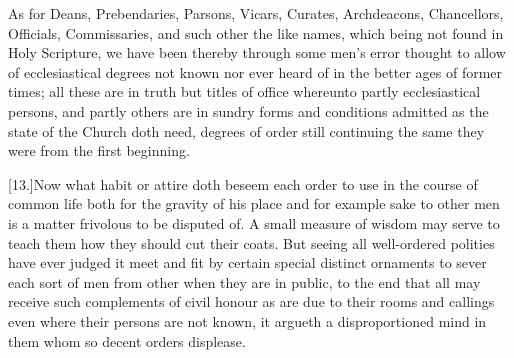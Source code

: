 As for Deans, Prebendaries, Parsons, Vicars, Curates, Archdeacons, Chancellors, Officials, Commissaries, and such other the like names, which being not found in Holy Scripture, we have been thereby through some men’s error thought to allow of ecclesiastical degrees not known nor ever heard of in the better ages of former times; all these are in truth but titles of office whereunto partly ecclesiastical persons, and partly others are in sundry forms and conditions admitted as the state of the Church doth need, degrees of order still continuing the same they were from the first beginning.

[13.]Now what habit or attire doth beseem each order to use in the course of common life both for the gravity of his  place and for example sake to other men is a matter frivolous to be disputed of.
 A small measure of wisdom may serve to teach them how they should cut their coats. But seeing all well-ordered polities have ever judged it meet and fit by certain special distinct ornaments to sever each sort of men from other when they are in public, to the end that all may receive such complements of civil honour as are due to their rooms and callings even where their persons are not known, it argueth a disproportioned mind in them whom so decent orders displease.


